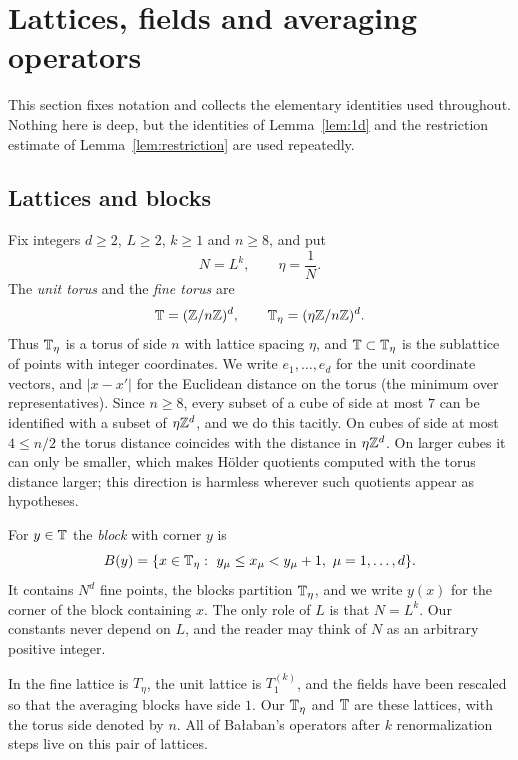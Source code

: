\section{Lattices, fields and averaging operators}\label{sec:setup}

This section fixes notation and collects the elementary identities used throughout. Nothing here is deep, but the identities of Lemma~\ref{lem:1d} and the restriction estimate of Lemma~\ref{lem:restriction} are used repeatedly.

\subsection{Lattices and blocks}

Fix integers $d\ge2$, $L\ge2$, $k\ge1$ and $n\ge8$, and put
\[
N=L^k,\qquad \eta=\frac1N .
\]
The \emph{unit torus} and the \emph{fine torus} are
\[
\mathbb T=(\mathbb Z/n\mathbb Z)^d,\qquad \mathbb T_\eta=(\eta\mathbb Z/n\mathbb Z)^d .
\]
Thus $\mathbb T_\eta$ is a torus of side $n$ with lattice spacing $\eta$, and $\mathbb T\subset\mathbb T_\eta$ is the sublattice of points with integer coordinates. We write $e_1,\dots,e_d$ for the unit coordinate vectors, and $|x-x'|$ for the Euclidean distance on the torus (the minimum over representatives). Since $n\ge8$, every subset of a cube of side at most $7$ can be identified with a subset of $\eta\mathbb Z^d$, and we do this tacitly. On cubes of side at most $4\le n/2$ the torus distance coincides with the distance in $\eta\mathbb Z^d$. On larger cubes it can only be smaller, which makes H\"older quotients computed with the torus distance larger; this direction is harmless wherever such quotients appear as hypotheses.

For $y\in\mathbb T$ the \emph{block} with corner $y$ is
\[
B(y)=\{x\in\mathbb T_\eta:\ y_\mu\le x_\mu<y_\mu+1,\ \mu=1,\dots,d\}.
\]
It contains $N^d$ fine points, the blocks partition $\mathbb T_\eta$, and we write $y(x)$ for the corner of the block containing $x$. The only role of $L$ is that $N=L^k$. Our constants never depend on $L$, and the reader may think of $N$ as an arbitrary positive integer.

\begin{remark}
In \cite{BalPropI} the fine lattice is $T_\eta$, the unit lattice is $T_1^{(k)}$, and the fields have been rescaled so that the averaging blocks have side $1$. Our $\mathbb T_\eta$ and $\mathbb T$ are these lattices, with the torus side denoted by $n$. All of Ba\l aban's operators after $k$ renormalization steps live on this pair of lattices.
\end{remark}

